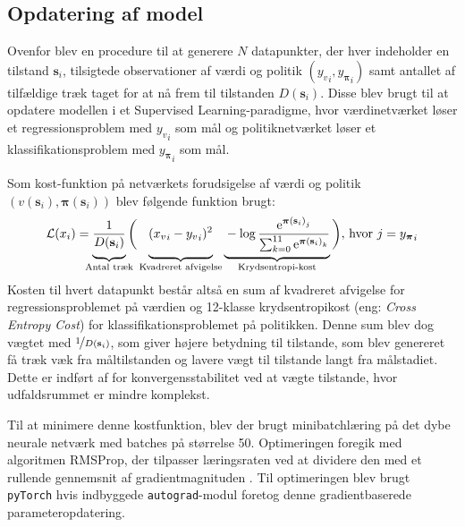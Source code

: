 \documentclass[../main.tex]{subfiles}
\begin{document}
\subsection*{Opdatering af model}

Ovenfor blev en procedure til at generere \(N\) datapunkter, der hver indeholder en tilstand \(\mathbf s_i\), tilsigtede observationer af værdi og politik \(\left({y_{v}}_i, {y_{\bm \pi }}_i \right)\) samt antallet af tilfældige træk taget for at nå frem til tilstanden \(D(\mathbf s_i)\). Disse blev  brugt til at opdatere modellen i et Supervised Learning-paradigme, hvor værdinetværket løser et regressionsproblem med \({y_{v}}_i\) som mål og politiknetværket løser et klassifikationsproblem med \({y_{\bm \pi }}_i\) som mål. 

Som kost-funktion på netværkets forudsigelse af værdi og politik
\(\left(v(\mathbf s_i), \bm \pi (\mathbf s_i)\right)\)
blev følgende funktion brugt:
\begin{equation}\label{eq:loss}
	\mathcal L(x_i) =
	\underbrace{\vphantom{\sum_{i}}
		\frac {1} {D(\mathbf s _i)}
	}
	_{\mathclap{
		\text{Antal træk}
		}	
 }
	 \bigg(
		\underbrace{\vphantom{\sum_{i}}
		({x_{v}}_i-{y_{v}}_i )^2
		}
		_{\text{Kvadreret afvigelse}}	
			\underbrace{\vphantom{\sum_{i}}
		- 
		\log 
			\frac{
					\eul{{\bm \pi(\mathbf s_i)}_j
				}
				}
				{
					\sum_{k=0}^{11}
					\eul{{\bm \pi(\mathbf s_i)}_k}
				}
			}
			_\text{Krydsentropi-kost}
	\bigg)
	\text{, hvor } j = {y_{\bm \pi }}_i
\end{equation}
Kosten til hvert datapunkt består altså en sum af kvadreret afvigelse for regressionsproblemet på værdien og 12-klasse krydsentropikost (eng: \textit{Cross Entropy Cost}) for klassifikationsproblemet på politikken.
Denne sum blev dog vægtet med \(\nicefrac 1 {D(\mathbf s _i)}\), som giver højere betydning til tilstande, som blev genereret få træk væk fra måltilstanden og lavere vægt til tilstande langt fra målstadiet.
Dette er indført af \cite{HumansBeGone} for konvergensstabilitet ved at vægte tilstande, hvor udfaldsrummet er mindre komplekst.

Til at minimere denne kostfunktion, blev der brugt minibatchlæring på det dybe neurale netværk med batches på størrelse 50. Optimeringen foregik med algoritmen RMSProp, der tilpasser læringsraten ved at dividere den med et rullende gennemsnit af gradientmagnituden \cite{RMSProp}. Til optimeringen blev brugt \texttt{pyTorch} hvis indbyggede \texttt{autograd}-modul foretog denne gradientbaserede parameteropdatering.
\end{document}
